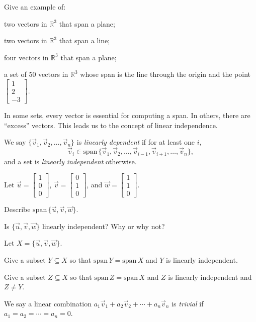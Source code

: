 \documentclass{problemset}
\newcommand{\R}{\mathbb{R}}
\renewcommand{\span}{\mathrm{span}\,}
\newcommand{\Span}{\mathrm{span}\,}
\newcommand{\mat}[1]{\begin{bmatrix}#1\end{bmatrix}}
\begin{document}
	\question
	Give an example of:
	\begin{parts}
		\item two vectors in $\R^3$ that span a plane;
		\item two vectors in $\R^3$ that span a line;
		\item four vectors in $\R^3$ that span a plane;
		\item a set of 50 vectors in $\R^3$ whose span is the line
		through the origin and the point $\mat{1\\2\\-3}$. \\
	\end{parts}

	In some sets, every vector is essential for computing a span.  In others,
	there are ``excess'' vectors.  This leads us to the concept of 
	linear independence.

	\begin{definition}
		We say $\{\vec v_1,\vec v_2,\ldots,\vec v_n\}$ is
		\emph{linearly dependent} if for at least one $i$,
		\[
			\vec v_i\in\span\{\vec v_1,\vec v_2,\ldots,\vec v_{i-1},
			\vec v_{i+1},\ldots,\vec v_n\},
		\]
		and a set is \emph{linearly independent} otherwise.
	\end{definition}

	\question
		Let $\vec u=\mat{1\\0\\0}$, $\vec v=\mat{0\\1\\0}$, and $\vec w=\mat{1\\1\\0}$.
	\begin{parts}
		\item Describe $\Span\{\vec u,\vec v,\vec w\}$.
		\item Is $\{\vec u,\vec v,\vec w\}$ linearly independent?  Why or why not?
	\end{parts}

	Let $X=\{\vec u,\vec v,\vec w\}$.

	\begin{parts}[resume]
		\item Give a subset $Y\subseteq X$ so that $\Span Y=\Span X$ and $Y$ is
		linearly independent.
		\item Give a subset $Z\subseteq X$ so that $\Span Z=\Span X$ and $Z$ is
		linearly independent and $Z\neq Y$.
	\end{parts}
	
	\begin{definition}
	We say a linear combination 
	$a_1\vec v_1+a_2\vec v_2+\cdots +a_n\vec v_n$
	is \emph{trivial} if $a_1=a_2=\cdots=a_n=0$.
	\end{definition}
	
\end{document}
